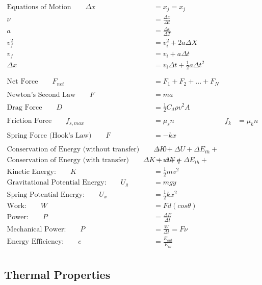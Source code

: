\documentclass[]{article}
\begin{document}
\begin{align*}
	\text{Equations of Motion} \qquad  \Delta x &= x_j = x_j \\
	\nu &= \frac{\Delta{x}}{\Delta{t}} \\
	a &= \frac{\Delta v}{\Delta T} \\
	v^2_f &= v^2_i + 2 a \Delta X \\
	v_f &= v_i + a \Delta t \\
	\Delta x &= v_i \Delta t  + \frac{1}{2} a \Delta t^2 \\
\\
\\
	\text{Net Force} \qquad F_{net} &= F_1 + F_2 + ... + F_N \\
	\\
	\text{Newton's Second Law} \qquad F &= m a \\
	\\
	\text{Drag Force} \qquad D &= \frac{1}{2} C_d \rho v^2 A \\
	\\
	\text{Friction Force} \qquad f_{s,max} &= \mu_s n & f_k &= \mu_k n \\
	\\
	\text{Spring Force  (Hook's Law)} \qquad F &= -k x \\
	\\
	\text{Conservation of Energy (without transfer)} \qquad \Delta K +  \Delta U +  \Delta E_{th} + &= 0 \\
	\text{Conservation of Energy (with transfer)} \qquad \Delta K +  \Delta U +  \Delta E_{th} + &= w + q \\
	\text{Kinetic Energy:} \qquad K &= \frac{1}{2} mv^2 \\
	\text{Gravitational Potential Energy:} \qquad U_g &= mgy \\
	\text{Spring Potential Energy:} \qquad U_x &= \frac{1}{2} kx^2 \\
	\text{Work:} \qquad W &= F d (cos \theta) \\
	\text{Power:} \qquad P &= \frac{\Delta E}{\Delta t} \\
	\text{Mechanical Power:} \qquad P &= \frac{W}{\Delta t} = F \nu \\
	\text{Energy Efficiency:} \qquad e &= \frac{E_{out}}{E_{in}} \\
\end{align*}

\newpage


\subsection{Thermal Properties}
\end{document}
